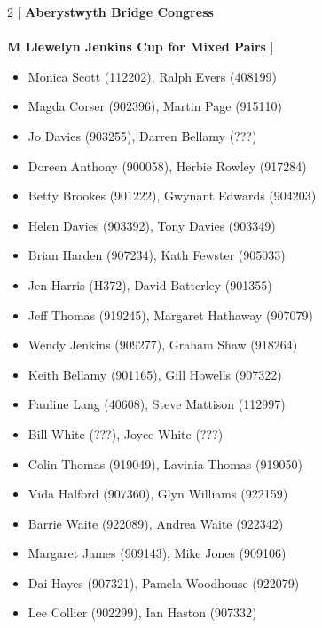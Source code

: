 \documentclass[11pt]{article}
\begin{document}
\begin{multicols}{2}
[
{\bf {\Large Aberystwyth Bridge Congress}}\\
\ \\
{\bf {\large M Llewelyn Jenkins Cup for Mixed Pairs}}
]
\begin{itemize}
\item Monica Scott (112202),
Ralph Evers (408199)
\item Magda Corser (902396),
Martin Page (915110)
\item Jo Davies (903255),
Darren Bellamy (???)
\item Doreen Anthony (900058),
Herbie Rowley (917284)
\item Betty Brookes (901222),
Gwynant Edwards (904203)
\item Helen Davies (903392),
Tony Davies (903349)
\item Brian Harden (907234),
Kath Fewster (905033)
\item Jen Harris (H372),
David Batterley (901355)
\item Jeff Thomas (919245),
Margaret Hathaway (907079)
\item Wendy Jenkins (909277),
Graham Shaw (918264)
\item Keith Bellamy (901165),
Gill Howells (907322)
\item Pauline Lang (40608),
Steve Mattison (112997)
\item Bill White (???),
Joyce White (???)
\item Colin Thomas (919049),
Lavinia Thomas (919050)
\item Vida Halford (907360),
Glyn Williams (922159)
\item Barrie Waite (922089),
Andrea Waite (922342)
\item Margaret James (909143),
Mike Jones (909106)
\item Dai Hayes (907321),
Pamela Woodhouse (922079)
\item Lee Collier (902299),
Ian Haston (907332)

\end{itemize}
\end{multicols}

\newpage
\end{document}
